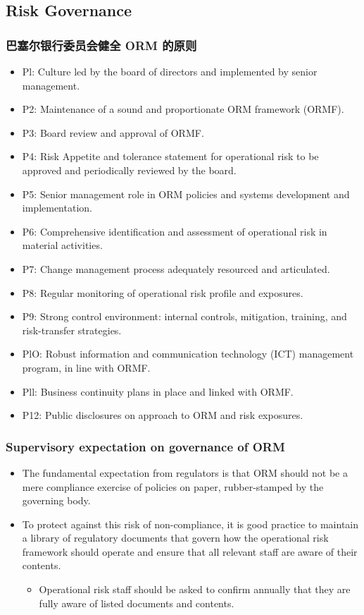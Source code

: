 \subsection{Risk Governance}


\subsubsection{巴塞尔银行委员会健全 ORM 的原则}

\begin{itemize}
\item Pl: Culture led by the board of directors and implemented by senior management.
\item P2: Maintenance of a sound and proportionate ORM framework (ORMF).
\item P3: Board review and approval of ORMF.
\item P4: Risk Appetite and tolerance statement for operational risk
to be approved and periodically reviewed by the board.
\item P5: Senior management role in ORM policies and systems development and implementation.

\item P6: Comprehensive identification and assessment of operational risk in material activities.
\item P7: Change management process adequately resourced and
articulated.
\item P8: Regular monitoring of operational risk profile and exposures.
\item P9: Strong control environment: internal controls, mitigation, training, and risk-transfer strategies.
\item PlO: Robust information and communication technology (ICT) management program, in line with ORMF.
\item Pll: Business continuity plans in place and linked with ORMF.
\item P12: Public disclosures on approach to ORM and risk exposures.
\end{itemize}

\subsubsection{Supervisory expectation on governance of ORM}

\begin{itemize}
\item The fundamental expectation from regulators is that ORM should not be a mere compliance exercise of policies on paper, rubber-stamped by the governing body.
\item To protect against this risk of non-compliance, it is good practice to maintain a library of regulatory documents that govern how the operational risk framework should operate and ensure that all relevant staff are aware of their contents.
    \begin{itemize}
    \item Operational risk staff should be asked to confirm annually that they are fully aware of listed documents and contents.
    \end{itemize}
\end{itemize}

